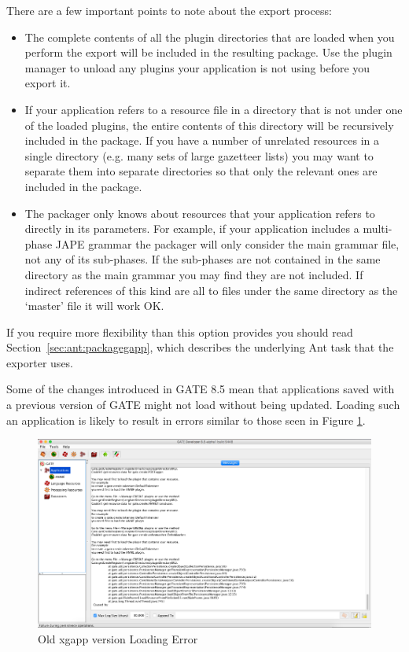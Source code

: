 There are a few important points to note about the export process:
\begin{itemize}
\item The complete contents of all the plugin directories that are loaded when
  you perform the export will be included in the resulting package.  Use the
  plugin manager to unload any plugins your application is not using before you
  export it.
\item If your application refers to a resource file in a directory that is not
  under one of the loaded plugins, the entire contents of this directory will be
  recursively included in the package.  If you have a number of unrelated
  resources in a single directory (e.g. many sets of large gazetteer lists) you
  may want to separate them into separate directories so that only the relevant
  ones are included in the package.
\item The packager only knows about resources that your application refers to
  directly in its parameters.  For example, if your application includes a
  multi-phase JAPE grammar the packager will only consider the main grammar
  file, not any of its sub-phases.  If the sub-phases are not contained in the
  same directory as the main grammar you may find they are not included.  If
  indirect references of this kind are all to files under the same directory as
  the `master' file it will work OK.
\end{itemize}

If you require more flexibility than this option provides you should read
Section~\ref{sec:ant:packagegapp}, which describes the underlying Ant task that
the exporter uses.

Some of the changes introduced in GATE 8.5 mean that applications saved with a previous version of GATE might not
load without being updated. Loading such an application is likely to result in errors similar to those seen in Figure \ref{fig:oldxgapp}.

\begin{figure}[htb]
\begin{center}
\includegraphics{old-xgapp-error.png}
\end{center}
\caption{Old xgapp version Loading Error}
\label{fig:oldxgapp}
\end{figure}

